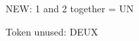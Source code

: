 \documentclass[12pt]{article}
\newcommand\oldstyle[2]{OLD: 1 = #1 and 2 = #2}
\newcommand\newstyle[1]{NEW: 1 and 2 together = #1\par Token unused: }
\let\mystyle\oldstyle
\let\mystyle\newstyle
\begin{document}
\mystyle{UN}{DEUX}
\end{document}
